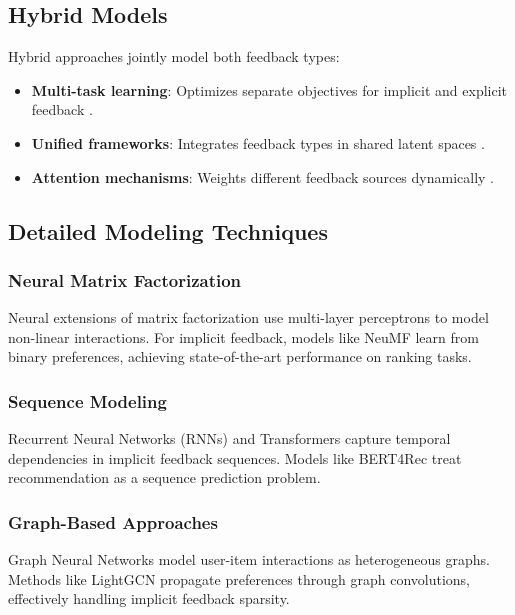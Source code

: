 \documentclass[acmsmall,review,anonymous]{acmart}
\begin{document}
\subsection{Hybrid Models}

Hybrid approaches jointly model both feedback types:
\begin{itemize}
    \item \textbf{Multi-task learning}: Optimizes separate objectives for implicit and explicit feedback \cite{ma2011learning}.
    \item \textbf{Unified frameworks}: Integrates feedback types in shared latent spaces \cite{lian2017cccfnet}.
    \item \textbf{Attention mechanisms}: Weights different feedback sources dynamically \cite{chen2017attentive}.
\end{itemize}

\subsection{Detailed Modeling Techniques}

\subsubsection{Neural Matrix Factorization}

Neural extensions of matrix factorization use multi-layer perceptrons to model non-linear interactions. For implicit feedback, models like NeuMF \cite{he2017neural} learn from binary preferences, achieving state-of-the-art performance on ranking tasks.

\subsubsection{Sequence Modeling}

Recurrent Neural Networks (RNNs) and Transformers capture temporal dependencies in implicit feedback sequences. Models like BERT4Rec \cite{sun2019bert4rec} treat recommendation as a sequence prediction problem.

\subsubsection{Graph-Based Approaches}

Graph Neural Networks model user-item interactions as heterogeneous graphs. Methods like LightGCN \cite{he2020lightgcn} propagate preferences through graph convolutions, effectively handling implicit feedback sparsity.
\end{document}
